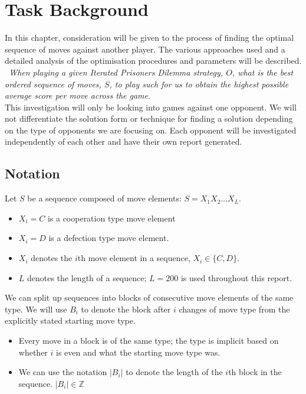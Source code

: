 
\chapter{Task Background}\label{ch:taskBackground}
In this chapter, consideration will be given to the process of finding the optimal sequence of moves against another player.
The various approaches used and a detailed analysis of the optimisation procedures and parameters will be described.\\

{\itshape~When playing a given Iterated Prisoners Dilemma strategy, \(O\), what is the best ordered sequence of moves, \(S\), to play such for us to obtain the highest possible average score per move across the game.}\\

This investigation will only be looking into games against one opponent.
We will not differentiate the solution form or technique for finding a solution depending on the type of opponents we are focusing on.
Each opponent will be investigated independently of each other and have their own report generated.


\section{Notation}\label{sec:notation}
Let \(S\) be a sequence composed of move elements: \(S = X_1 X_2 \ldots X_L\).
\begin{itemize}
    \item \(X_i=C\) is a cooperation type move element
    \item \(X_i=D\) is a defection type move element.
    \item \(X_i\) denotes the \(i\)th move element in a sequence, \(X_i \in \{C,D\}\).
    \item \(L\) denotes the length of a sequence; \(L=200\) is used throughout this report.
\end{itemize}

We can split up sequences into blocks of consecutive move elements of the same type.
We will use \(B_i\) to denote the block after \(i\) changes of move type from the explicitly stated starting move type.
\begin{itemize}
    \item Every move in a block is of the same type;
    the type is implicit based on whether \(i\) is even and what the starting move type was.
    \item We can use the notation \(|B_i|\) to denote the length of the \(i\)th block in the sequence. \(|B_i| \in \mathbb{Z}\)
\end{itemize}

